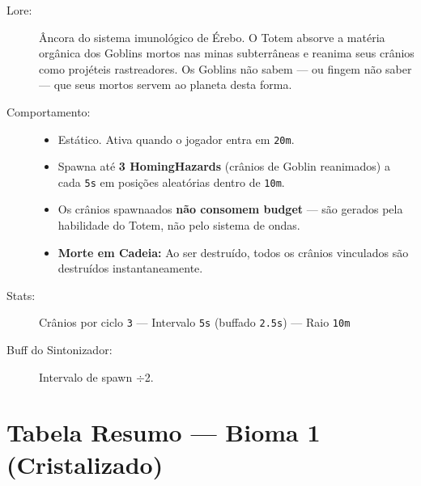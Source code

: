 \documentclass[a4paper,12pt]{report}
\begin{document}
\begin{description}
    \item[Lore:] Âncora do sistema imunológico de Érebo. O Totem absorve a matéria orgânica dos Goblins mortos nas minas subterrâneas e reanima seus crânios como projéteis rastreadores. Os Goblins não sabem — ou fingem não saber — que seus mortos servem ao planeta desta forma.
    \item[Comportamento:]
    \begin{itemize}
        \item Estático. Ativa quando o jogador entra em \texttt{20m}.
        \item Spawna até \textbf{3 HomingHazards} (crânios de Goblin reanimados) a cada \texttt{5s} em posições aleatórias dentro de \texttt{10m}.
        \item Os crânios spawnaados \textbf{não consomem budget} — são gerados pela habilidade do Totem, não pelo sistema de ondas.
        \item \textbf{Morte em Cadeia:} Ao ser destruído, todos os crânios vinculados são destruídos instantaneamente.
    \end{itemize}
    \item[Stats:] Crânios por ciclo \texttt{3} --- Intervalo \texttt{5s} (buffado \texttt{2.5s}) --- Raio \texttt{10m}
    \item[Buff do Sintonizador:] Intervalo de spawn $\div$2.
\end{description}

\section{Tabela Resumo --- Bioma 1 (Cristalizado)}
\end{document}

